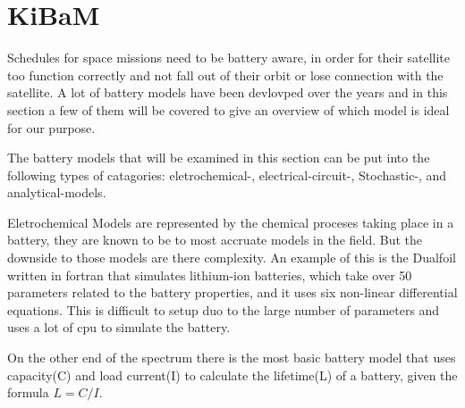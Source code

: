 \section{KiBaM}\label{sec:kibam}
Schedules for space missions need to be battery aware, in order for their satellite too function correctly and not fall out of their orbit or lose connection with the satellite. A lot of battery models have been devlovped over the years and in this section a few of them will be covered to give an overview of which model is ideal for our purpose.

The battery models that will be examined in this section can be put into the following types of catagories: eletrochemical-, electrical-circuit-, Stochastic-, and analytical-models.

Eletrochemical Models are represented by the chemical proceses taking place in a battery, they are known to be to most accruate models in the field. But the downside to those models are there complexity. An example of this is the Dualfoil written in fortran that simulates lithium-ion batteries, which take over 50 parameters related to the battery properties, and it uses six non-linear differential equations. This is difficult to setup duo to the large number of parameters and uses a lot of cpu to simulate the battery.

On the other end of the spectrum there is the most basic battery model that uses capacity(C) and load current(I) to calculate the lifetime(L) of a battery, given the formula $L=C/I$. 



